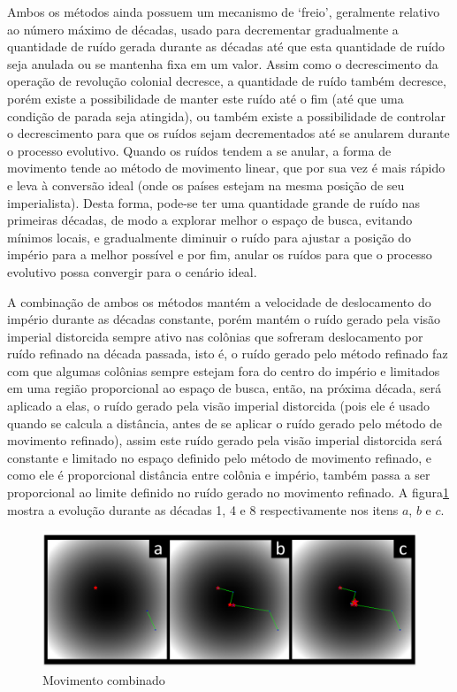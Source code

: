Ambos os métodos ainda possuem um mecanismo de ‘freio’, geralmente relativo ao número máximo de décadas, usado para decrementar gradualmente a quantidade de ruído gerada durante as décadas até que esta quantidade de ruído seja anulada ou se mantenha fixa em um valor. Assim como o decrescimento da operação de revolução colonial decresce, a quantidade de ruído também decresce, porém existe a possibilidade de manter este ruído até o fim (até que uma condição de parada seja atingida), ou também existe a possibilidade de controlar o decrescimento para que os ruídos sejam decrementados até se anularem durante o processo evolutivo. Quando os ruídos tendem a se anular, a forma de movimento tende ao método de movimento linear, que por sua vez é mais rápido e leva à conversão ideal (onde os países estejam na mesma posição de seu imperialista). Desta forma, pode-se ter uma quantidade grande de ruído nas primeiras décadas, de modo a explorar melhor o espaço de busca, evitando mínimos locais, e gradualmente diminuir o ruído para ajustar a posição do império para a melhor possível e por fim, anular os ruídos para que o processo evolutivo possa convergir para o cenário ideal.

A combinação de ambos os métodos mantém a velocidade de deslocamento do império durante as décadas constante, porém mantém o ruído gerado pela visão imperial distorcida sempre ativo nas colônias que sofreram deslocamento por ruído refinado na década passada, isto é, o ruído gerado pelo método refinado faz com que algumas colônias sempre estejam fora do centro do império e limitados em uma região proporcional ao espaço de busca, então, na próxima década, será aplicado a elas, o ruído gerado pela visão imperial distorcida (pois ele é usado quando se calcula a distância, antes de se aplicar o ruído gerado pelo método de movimento refinado), assim este ruído gerado pela visão imperial distorcida será constante e limitado no espaço definido pelo método de movimento refinado, e como ele é proporcional distância entre colônia e império, também passa a ser proporcional ao limite definido no ruído gerado no movimento refinado. A figura\ref{fig:MovimentoCombinado} mostra a evolução durante as décadas 1, 4 e 8 respectivamente nos itens \(a\), \(b\) e \(c\).

\begin{figure}[h]
	\centering
	\includegraphics[scale=0.6]{Figuras/MovimentoCombinado.png}
	\caption{Movimento combinado}	
    \label{fig:MovimentoCombinado}
\end{figure}

